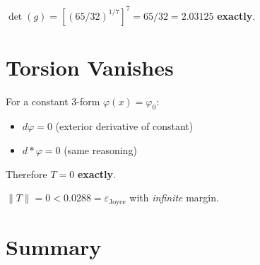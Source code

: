 \begin{theorem}\label{thm:det_exact}
    \leanok
    $\det(g) = \left[(65/32)^{1/7}\right]^7 = 65/32 = 2.03125$ \textbf{exactly}.
\end{theorem}

\section{Torsion Vanishes}

\begin{theorem}\label{thm:torsion_zero}
    \leanok
    For a constant 3-form $\varphi(x) = \varphi_0$:
    \begin{itemize}
        \item $d\varphi = 0$ (exterior derivative of constant)
        \item $d{*}\varphi = 0$ (same reasoning)
    \end{itemize}
    Therefore $T = 0$ \textbf{exactly}.
\end{theorem}

\begin{theorem}\label{thm:joyce_exact}
    \leanok
    $\|T\| = 0 < 0.0288 = \varepsilon_{\text{Joyce}}$ with \emph{infinite} margin.
\end{theorem}

\section{Summary}

